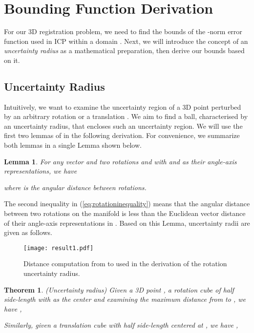 \documentclass[10pt,journal,cspaper,compsoc]{IEEEtran}
\newtheorem{theorem}{Theorem}
\newtheorem{lemma}{Lemma}
\begin{document}
\section{Bounding Function Derivation}\label{sec:bounds}
For our 3D registration problem, we need to find the bounds of the -norm error function used in ICP within a domain . Next, we will introduce the concept of an \emph{uncertainty radius} as a mathematical preparation, then derive our bounds based on it.

\subsection{Uncertainty Radius}\label{sec:uncertainty}
Intuitively, we want to examine the uncertainty region of a 3D point  perturbed by an arbitrary rotation  or a translation . We aim to find a ball, characterised by an uncertainty radius, that encloses such an uncertainty region. We will use the first two lemmas of \cite{hartley2009global} in the following derivation. For convenience, we summarize both lemmas in a single Lemma shown below.\begin{lemma}
    For any vector  and two rotations  and  with  and  as their angle-axis representations, we have
    
    where  is the angular distance between rotations.
\end{lemma}

The second inequality in (\ref{eq:rotationinequality}) means that the angular distance between two rotations on the  manifold is less than the Euclidean vector distance of their angle-axis representations in .  Based on this Lemma, uncertainty radii are given as follows.

\begin{figure}[!t]
\begin{center}
\texttt{[image: result1.pdf]}
\caption{Distance computation from  to  used in the derivation of the rotation uncertainty radius.}\label{fig:result1eq1}
\end{center}
\end{figure}

\begin{theorem}\label{rs:u_r}(Uncertainty radius)
Given a 3D point , a rotation cube  of half side-length  with  as the center and examining the maximum distance from  to , we have ,

Similarly, given a translation cube  with half side-length  centered at , we have ,

\end{theorem}
\end{document}
